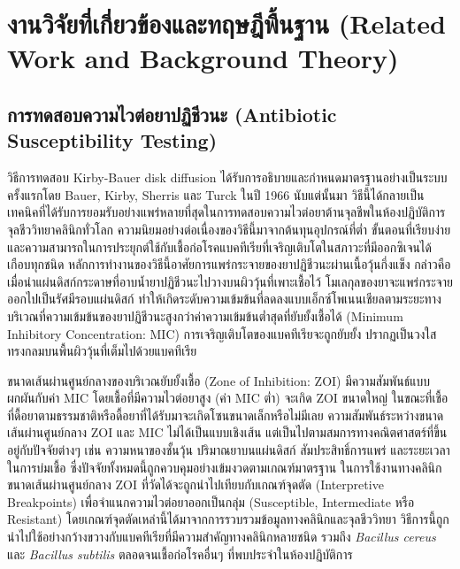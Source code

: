 ﻿%
\chapter{งานวิจัยที่เกี่ยวข้องและทฤษฎีพื้นฐาน (Related Work and Background Theory)}

\section{การทดสอบความไวต่อยาปฏิชีวนะ (Antibiotic Susceptibility Testing)}

วิธีการทดสอบ Kirby-Bauer disk diffusion ได้รับการอธิบายและกำหนดมาตรฐานอย่างเป็นระบบครั้งแรกโดย Bauer, Kirby, Sherris และ Turck ในปี 1966 นับแต่นั้นมา วิธีนี้ได้กลายเป็นเทคนิคที่ได้รับการยอมรับอย่างแพร่หลายที่สุดในการทดสอบความไวต่อยาต้านจุลชีพในห้องปฏิบัติการจุลชีววิทยาคลินิกทั่วโลก \cite{asm2009kirby,clsi2025} ความนิยมอย่างต่อเนื่องของวิธีนี้มาจากต้นทุนอุปกรณ์ที่ต่ำ ขั้นตอนที่เรียบง่าย และความสามารถในการประยุกต์ใช้กับเชื้อก่อโรคแบคทีเรียที่เจริญเติบโตในสภาวะที่มีออกซิเจนได้เกือบทุกชนิด หลักการทำงานของวิธีนี้อาศัยการแพร่กระจายของยาปฏิชีวนะผ่านเนื้อวุ้นกึ่งแข็ง กล่าวคือ เมื่อนำแผ่นดิสก์กระดาษที่อาบน้ำยาปฏิชีวนะไปวางบนผิววุ้นที่เพาะเชื้อไว้ โมเลกุลของยาจะแพร่กระจายออกไปเป็นรัศมีรอบแผ่นดิสก์ ทำให้เกิดระดับความเข้มข้นที่ลดลงแบบเอ็กซ์โพเนนเชียลตามระยะทาง บริเวณที่ความเข้มข้นของยาปฏิชีวนะสูงกว่าค่าความเข้มข้นต่ำสุดที่ยับยั้งเชื้อได้ (Minimum Inhibitory Concentration: MIC) การเจริญเติบโตของแบคทีเรียจะถูกยับยั้ง ปรากฏเป็นวงใสทรงกลมบนพื้นผิววุ้นที่เต็มไปด้วยแบคทีเรีย

ขนาดเส้นผ่านศูนย์กลางของบริเวณยับยั้งเชื้อ (Zone of Inhibition: ZOI) มีความสัมพันธ์แบบผกผันกับค่า MIC โดยเชื้อที่มีความไวต่อยาสูง (ค่า MIC ต่ำ) จะเกิด ZOI ขนาดใหญ่ ในขณะที่เชื้อที่ดื้อยาตามธรรมชาติหรือดื้อยาที่ได้รับมาจะเกิดโซนขนาดเล็กหรือไม่มีเลย ความสัมพันธ์ระหว่างขนาดเส้นผ่านศูนย์กลาง ZOI และ MIC ไม่ได้เป็นแบบเชิงเส้น แต่เป็นไปตามสมการทางคณิตศาสตร์ที่ขึ้นอยู่กับปัจจัยต่างๆ เช่น ความหนาของชั้นวุ้น ปริมาณยาบนแผ่นดิสก์ สัมประสิทธิ์การแพร่ และระยะเวลาในการบ่มเชื้อ ซึ่งปัจจัยทั้งหมดนี้ถูกควบคุมอย่างเข้มงวดตามเกณฑ์มาตรฐาน ในการใช้งานทางคลินิก ขนาดเส้นผ่านศูนย์กลาง ZOI ที่วัดได้จะถูกนำไปเทียบกับเกณฑ์จุดตัด (Interpretive Breakpoints) เพื่อจำแนกความไวต่อยาออกเป็นกลุ่ม (Susceptible, Intermediate หรือ Resistant) โดยเกณฑ์จุดตัดเหล่านี้ได้มาจากการรวบรวมข้อมูลทางคลินิกและจุลชีววิทยา วิธีการนี้ถูกนำไปใช้อย่างกว้างขวางกับแบคทีเรียที่มีความสำคัญทางคลินิกหลายชนิด รวมถึง \textit{Bacillus cereus} \cite{fitwi2020} และ \textit{Bacillus subtilis} \cite{jiang2023} ตลอดจนเชื้อก่อโรคอื่นๆ ที่พบประจำในห้องปฏิบัติการ

